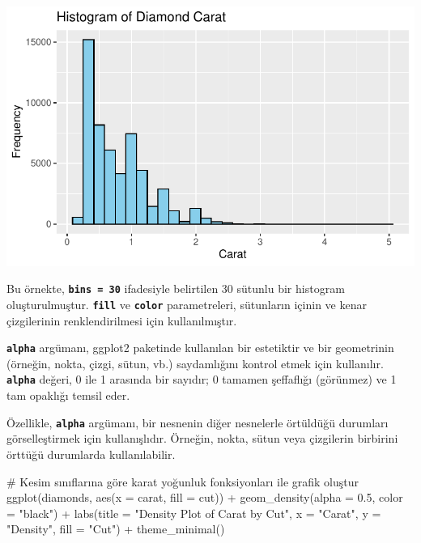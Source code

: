 \documentclass[
  letterpaper,
  DIV=11,
  numbers=noendperiod]{scrreprt}
\newenvironment{Shaded}{\begin{snugshade}}{\end{snugshade}}
\newcommand{\AttributeTok}[1]{\textcolor[rgb]{0.40,0.45,0.13}{#1}}
\newcommand{\CommentTok}[1]{\textcolor[rgb]{0.37,0.37,0.37}{#1}}
\newcommand{\FloatTok}[1]{\textcolor[rgb]{0.68,0.00,0.00}{#1}}
\newcommand{\FunctionTok}[1]{\textcolor[rgb]{0.28,0.35,0.67}{#1}}
\newcommand{\NormalTok}[1]{\textcolor[rgb]{0.00,0.23,0.31}{#1}}
\newcommand{\SpecialCharTok}[1]{\textcolor[rgb]{0.37,0.37,0.37}{#1}}
\newcommand{\StringTok}[1]{\textcolor[rgb]{0.13,0.47,0.30}{#1}}
\begin{document}
\includegraphics{ggplot2_files/figure-pdf/unnamed-chunk-3-1.pdf}

Bu örnekte, \textbf{\texttt{bins\ =\ 30}} ifadesiyle belirtilen 30
sütunlu bir histogram oluşturulmuştur. \textbf{\texttt{fill}} ve
\textbf{\texttt{color}} parametreleri, sütunların içinin ve kenar
çizgilerinin renklendirilmesi için kullanılmıştır.

\textbf{\texttt{alpha}} argümanı, ggplot2 paketinde kullanılan bir
estetiktir ve bir geometrinin (örneğin, nokta, çizgi, sütun, vb.)
saydamlığını kontrol etmek için kullanılır. \textbf{\texttt{alpha}}
değeri, 0 ile 1 arasında bir sayıdır; 0 tamamen şeffaflığı (görünmez) ve
1 tam opaklığı temsil eder.

Özellikle, \textbf{\texttt{alpha}} argümanı, bir nesnenin diğer
nesnelerle örtüldüğü durumları görselleştirmek için kullanışlıdır.
Örneğin, nokta, sütun veya çizgilerin birbirini örttüğü durumlarda
kullanılabilir.

\begin{Shaded}
\begin{Highlighting}[]
\CommentTok{\# Kesim sınıflarına göre karat yoğunluk fonksiyonları ile grafik oluştur}
\FunctionTok{ggplot}\NormalTok{(diamonds, }\FunctionTok{aes}\NormalTok{(}\AttributeTok{x =}\NormalTok{ carat, }\AttributeTok{fill =}\NormalTok{ cut)) }\SpecialCharTok{+}
  \FunctionTok{geom\_density}\NormalTok{(}\AttributeTok{alpha =} \FloatTok{0.5}\NormalTok{, }\AttributeTok{color =} \StringTok{"black"}\NormalTok{) }\SpecialCharTok{+}
  \FunctionTok{labs}\NormalTok{(}\AttributeTok{title =} \StringTok{"Density Plot of Carat by Cut"}\NormalTok{,}
       \AttributeTok{x =} \StringTok{"Carat"}\NormalTok{,}
       \AttributeTok{y =} \StringTok{"Density"}\NormalTok{,}
       \AttributeTok{fill =} \StringTok{"Cut"}\NormalTok{) }\SpecialCharTok{+}
  \FunctionTok{theme\_minimal}\NormalTok{()}
\end{Highlighting}
\end{Shaded}
\end{document}
